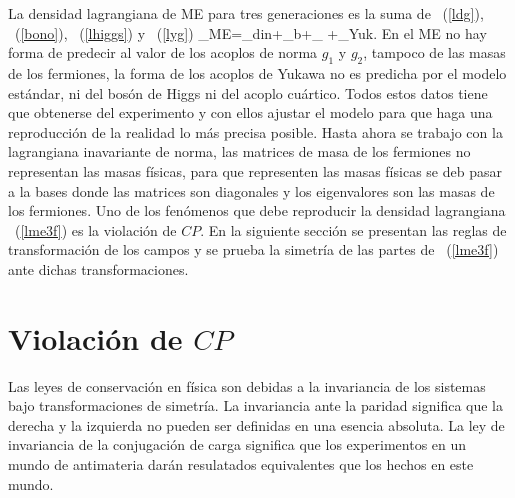 La densidad lagrangiana de ME para tres generaciones es la suma de 
~(\ref{ldg}), ~(\ref{bono}), ~(\ref{lhiggs}) y ~(\ref{lyg})
\be\label{lme3f}
_{ME}=_{din}+_b+_{\Phi}
+_{Yuk}.
\ee
En el ME no hay forma de predecir al valor de los acoplos de norma $g_1$ y 
$g_2$, tampoco de las masas de los fermiones, la forma de los acoplos de Yukawa
no es predicha por el modelo est\'andar, ni del bos\'on de Higgs ni
del acoplo cu\'artico. Todos estos datos tiene que obtenerse del experimento
y con ellos ajustar el modelo para que haga una reproducci\'on de la realidad lo
m\'as precisa posible. Hasta ahora se trabajo con la lagrangiana inavariante de norma, las matrices de masa de los fermiones no representan las masas f\'isicas,
para que representen las masas f\'isicas se deb pasar a la bases donde las
matrices son diagonales y los eigenvalores son las masas de los fermiones. Uno
de los fen\'omenos que debe reproducir la densidad lagrangiana ~(\ref{lme3f}) es
la violaci\'on de $CP$. En la siguiente secci\'on se presentan las reglas de
transformaci\'on de los campos y se prueba la simetr\'ia de las partes de 
~(\ref{lme3f}) ante dichas transformaciones.

\section{Violaci\'on de $CP$}
Las leyes de conservaci\'on en f\'isica son debidas a la invariancia de los
sistemas bajo transformaciones de simetr\'ia. La invariancia ante la paridad 
significa que la derecha y la izquierda no pueden ser definidas en una esencia 
absoluta. La ley de invariancia de la conjugaci\'on de carga significa que los 
experimentos en un mundo de antimateria dar\'an resulatados equivalentes que los
hechos en este mundo.

